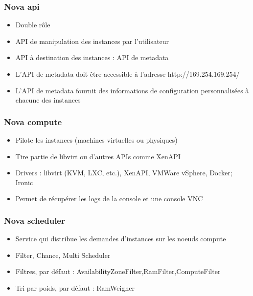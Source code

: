   \begin{frame}
    \frametitle{Nova api}
    \begin{itemize}
      \item Double rôle
      \item API de manipulation des instances par l'utilisateur
      \item API à destination des instances : API de metadata
      \item L'API de metadata doit être accessible à l'adresse http://169.254.169.254/
      \item L'API de metadata fournit des informations de configuration personnalisées à chacune des instances
    \end{itemize}
  \end{frame}

  \begin{frame}
    \frametitle{Nova compute}
    \begin{itemize}
      \item Pilote les instances (machines virtuelles ou physiques)
      \item Tire partie de libvirt ou d'autres APIs comme XenAPI
      \item Drivers : libvirt (KVM, LXC, etc.), XenAPI, VMWare vSphere, Docker; Ironic
      \item Permet de récupérer les logs de la console et une console VNC
    \end{itemize}
  \end{frame}

  \begin{frame}
    \frametitle{Nova scheduler}
    \begin{itemize}
      \item Service qui distribue les demandes d'instances sur les noeuds compute
      \item Filter, Chance, Multi Scheduler
      \item Filtres, par défaut : AvailabilityZoneFilter,RamFilter,ComputeFilter
      \item Tri par poids, par défaut : RamWeigher
    \end{itemize}
  \end{frame}

